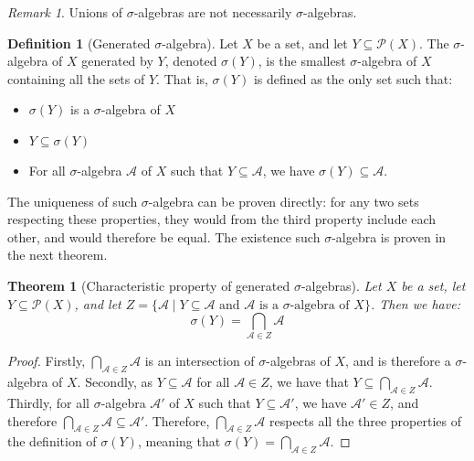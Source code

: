 \documentclass{article}
\newtheorem{theorem}{Theorem}[section]
\theoremstyle{definition}
\newtheorem{definition}{Definition}[section]
\theoremstyle{remark}
\newtheorem*{remark}{Remark}
\theoremstyle{example}
\theoremstyle{notation}
\begin{document}
\begin{remark}
    Unions of $\sigma$-algebras are not necessarily $\sigma$-algebras.
\end{remark}

\begin{definition}[Generated $\sigma$-algebra]
    Let $X$ be a set, and let $Y \subseteq \mathcal{P}(X)$. The $\sigma$-algebra of $X$ generated by $Y$, denoted $\sigma(Y)$, is the smallest $\sigma$-algebra of $X$ containing all the sets of $Y$. That is, $\sigma(Y)$ is defined as the only set such that:
    \begin{itemize}
        \item $\sigma(Y)$ is a $\sigma$-algebra of $X$
        \item $Y \subseteq \sigma(Y)$
        \item For all $\sigma$-algebra $\mathcal{A}$ of $X$ such that $Y \subseteq \mathcal{A}$, we have $\sigma(Y) \subseteq \mathcal{A}$.
    \end{itemize}
    The uniqueness of such $\sigma$-algebra can be proven directly: for any two sets respecting these properties, they would from the third property include each other, and would therefore be equal. The existence such $\sigma$-algebra is proven in the next theorem.
\end{definition}

\begin{theorem}[Characteristic property of generated $\sigma$-algebras]
    Let $X$ be a set, let $Y \subseteq \mathcal{P}(X)$, and let $Z = \{\mathcal{A} \mid \text{$Y \subseteq \mathcal{A}$ and $\mathcal{A}$ is a $\sigma$-algebra of $X$}\}$. Then we have:
        $$\sigma(Y) = \bigcap_{\mathcal{A} \in Z} \mathcal{A}$$
\end{theorem}

\begin{proof}
		Firstly, $\bigcap_{\mathcal{A} \in Z} \mathcal{A}$ is an intersection of $\sigma$-algebras of $X$, and is therefore a $\sigma$-algebra of $X$. Secondly, as $Y \subseteq \mathcal{A}$ for all $\mathcal{A} \in Z$, we have that $Y \subseteq \bigcap_{\mathcal{A} \in Z} \mathcal{A}$. Thirdly, for all $\sigma$-algebra $\mathcal{A}'$ of $X$ such that $Y \subseteq \mathcal{A}'$, we have $\mathcal{A}' \in Z$, and therefore $\bigcap_{\mathcal{A} \in Z} \mathcal{A} \subseteq \mathcal{A}'$. Therefore, $\bigcap_{\mathcal{A} \in Z} \mathcal{A}$ respects all the three properties of the definition of $\sigma(Y)$, meaning that $\sigma(Y) = \bigcap_{\mathcal{A} \in Z} \mathcal{A}$.
\end{proof}
\end{document}
